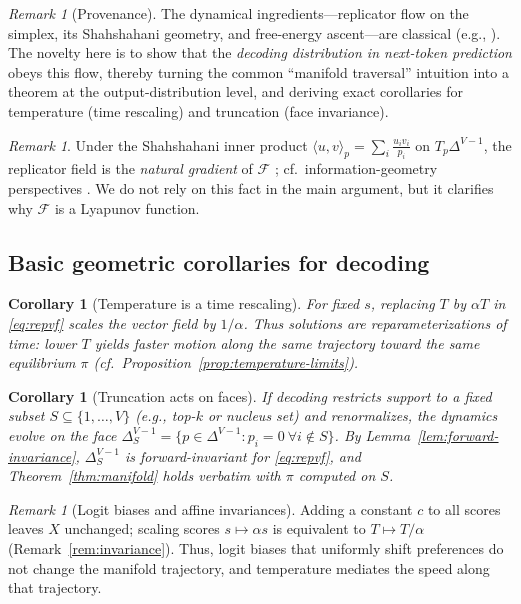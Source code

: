 \documentclass[11pt,reqno]{article}
\numberwithin{equation}{section}
\theoremstyle{plain}
\newtheorem{corollary}[theorem]{Corollary}
\theoremstyle{definition}
\theoremstyle{remark}
\newtheorem{remark}[theorem]{Remark}
\newcommand{\1}{\mathbbm{1}}
\newcommand{\simplex}{\Delta^{V-1}}
\begin{document}
\begin{remark}[Provenance]
The dynamical ingredients—replicator flow on the simplex, its Shahshahani geometry, and free-energy ascent—are classical
(e.g., \citealp{shahshahani1979nouvelle,hofbauer1998evolutionary}). The novelty here is to show that the
\emph{decoding distribution in next-token prediction} obeys this flow, thereby turning the common “manifold traversal”
intuition into a theorem at the output-distribution level, and deriving exact corollaries for temperature (time rescaling)
and truncation (face invariance).
\end{remark}



\begin{remark}
Under the Shahshahani inner product $\langle u,v\rangle_p=\sum_i \frac{u_i v_i}{p_i}$ on $T_p\simplex$, the replicator field is the \emph{natural gradient} of $\mathcal{F}$ \citep{shahshahani1979nouvelle,hofbauer1998evolutionary}; cf.\ information-geometry perspectives \citep{amari1998natural,raginsky2012mirror}. We do not rely on this fact in the main argument, but it clarifies why $\mathcal{F}$ is a Lyapunov function.
\end{remark}

\subsection{Basic geometric corollaries for decoding}
\begin{corollary}[Temperature is a time rescaling]\label{cor:temp-rescale}
For fixed $s$, replacing $T$ by $\alpha T$ in \eqref{eq:repvf} scales the vector field by $1/\alpha$. Thus solutions are reparameterizations of time: lower $T$ yields faster motion along the same trajectory toward the same equilibrium $\pi$ (cf.\ Proposition~\ref{prop:temperature-limits}).
\end{corollary}

\begin{corollary}[Truncation acts on faces]\label{cor:faces}
If decoding restricts support to a fixed subset $S\subseteq\{1,\dots,V\}$ (e.g., top-$k$ or nucleus set) and renormalizes, the dynamics evolve on the face
$\simplex_S=\{p\in\simplex: p_i=0\ \forall i\notin S\}$.
By Lemma~\ref{lem:forward-invariance}, $\simplex_S$ is forward-invariant for \eqref{eq:repvf}, and Theorem~\ref{thm:manifold} holds verbatim with $\pi$ computed on $S$.
\end{corollary}

\begin{remark}[Logit biases and affine invariances]
Adding a constant $c$ to all scores leaves $X$ unchanged; scaling scores $s\mapsto \alpha s$ is equivalent to $T\mapsto T/\alpha$ (Remark~\ref{rem:invariance}). Thus, logit biases that uniformly shift preferences do not change the manifold trajectory, and temperature mediates the speed along that trajectory.
\end{remark}
\end{document}
